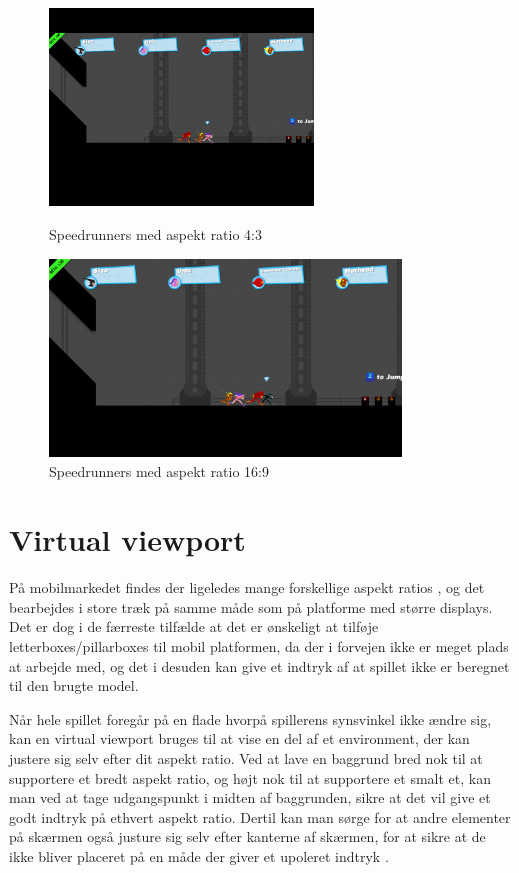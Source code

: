 \documentclass[Main.tex]{AspectRatio.tex}
\begin{document}
\begin{figure}[h]
\centering
\parbox{7cm}{
\includegraphics[width = 7cm]{billeder/Speedrunners_4,3}
\caption{Speedrunners med aspekt ratio 4:3}    
\label{Speedrunners_4,3}}
\qquad
\begin{minipage}{9.33cm}
\includegraphics[width = 9.33cm]{billeder/Speedrunners_16,9}
\caption{Speedrunners med aspekt ratio 16:9}    
\label{Speedrunners_16,9}
\end{minipage}
\end{figure}

\section{Virtual viewport}

På mobilmarkedet findes der ligeledes mange forskellige aspekt ratios \cite{CommonResolutions}, og det bearbejdes i store træk på samme måde som på platforme med større displays. Det er dog i de færreste tilfælde at det er ønskeligt at tilføje letterboxes/pillarboxes til mobil platformen, da der i forvejen ikke er meget plads at arbejde med, og det i desuden kan give et indtryk af at spillet ikke er beregnet til den brugte model.

Når hele spillet foregår på en flade hvorpå spillerens synsvinkel ikke ændre sig, kan en virtual viewport bruges til at vise en del af et environment, der kan justere sig selv efter dit aspekt ratio. Ved at lave en baggrund bred nok til at supportere et bredt aspekt ratio, og højt nok til at supportere et smalt et, kan man ved at tage udgangspunkt i midten af baggrunden, sikre at det vil give et godt indtryk på ethvert aspekt ratio. Dertil kan man sørge for at andre elementer på skærmen også justure sig selv efter kanterne af skærmen, for at sikre at de ikke bliver placeret på en måde der giver et upoleret indtryk \cite{gemserk}.
\end{document}

